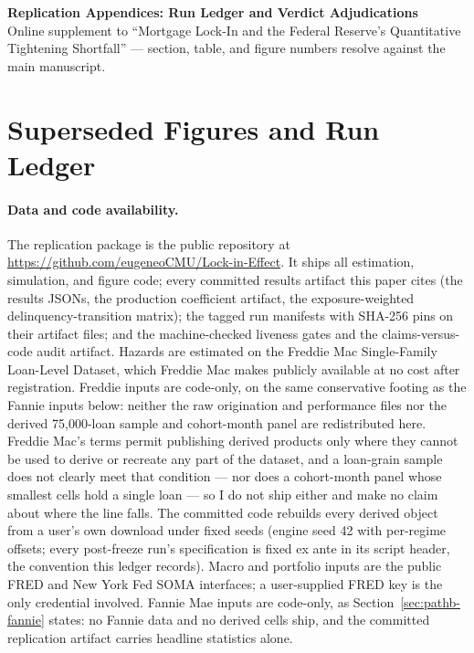 \documentclass[12pt]{article}
\renewcommand{\thesection}{\Roman{section}}
\begin{document}
\begin{center}\Large\textbf{Replication Appendices: Run Ledger and Verdict Adjudications}\\[4pt]\normalsize Online supplement to ``Mortgage Lock-In and the Federal Reserve's Quantitative Tightening Shortfall'' --- section, table, and figure numbers resolve against the main manuscript.\end{center}

\appendix
\renewcommand{\thesection}{L\arabic{section}}

\section{Superseded Figures and Run Ledger}\label{app:ledger}

\paragraph{Data and code availability.} The replication package is the public repository at \url{https://github.com/eugeneoCMU/Lock-in-Effect}. It ships all estimation, simulation, and figure code; every committed results artifact this paper cites (the results JSONs, the production coefficient artifact, the exposure-weighted delinquency-transition matrix); the tagged run manifests with SHA-256 pins on their artifact files; and the machine-checked liveness gates and the claims-versus-code audit artifact. Hazards are estimated on the Freddie Mac Single-Family Loan-Level Dataset, which Freddie Mac makes publicly available at no cost after registration. Freddie inputs are code-only, on the same conservative footing as the Fannie inputs below: neither the raw origination and performance files nor the derived 75{,}000-loan sample and cohort-month panel are redistributed here. Freddie Mac's terms permit publishing derived products only where they cannot be used to derive or recreate any part of the dataset, and a loan-grain sample does not clearly meet that condition --- nor does a cohort-month panel whose smallest cells hold a single loan --- so I do not ship either and make no claim about where the line falls. The committed code rebuilds every derived object from a user's own download under fixed seeds (engine seed 42 with per-regime offsets; every post-freeze run's specification is fixed ex ante in its script header, the convention this ledger records). Macro and portfolio inputs are the public FRED and New York Fed SOMA interfaces; a user-supplied FRED key is the only credential involved. Fannie Mae inputs are code-only, as Section~\ref{sec:pathb-fannie} states: no Fannie data and no derived cells ship, and the committed replication artifact carries headline statistics alone.
\end{document}
